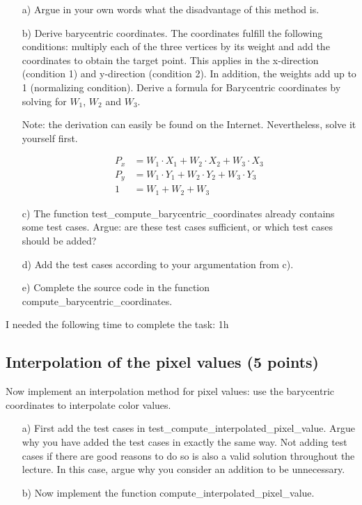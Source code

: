 \begin{enumerate}

\item[a)] Argue in your own words what the disadvantage of this method is.

\item[b)] Derive barycentric coordinates. The coordinates fulfill the following conditions: multiply each of the three vertices by its weight and add the coordinates to obtain the target point. This applies in the x-direction (condition 1) and y-direction (condition 2). In addition, the weights add up to 1 (normalizing condition). Derive a formula for
Barycentric coordinates by solving for $W_1$, $W_2$ and $W_3$.

Note: the derivation can easily be found on the Internet. Nevertheless, solve it yourself first.

\begin{align}
	P_x &= W_1 \cdot X_1 + W_2 \cdot X_2 + W_3 \cdot X_3 \\
	P_y &= W_1 \cdot Y_1 + W_2 \cdot Y_2 + W_3 \cdot Y_3 \\
	1 &= W_1 + W_2 + W_3
\end{align}

\item[c)] The function test\_compute\_barycentric\_coordinates already contains some test cases. Argue: are these test cases sufficient, or which test cases should be added? 

\item[d)] Add the test cases according to your argumentation from c). 

\item[e)] Complete the source code in the function compute\_barycentric\_coordinates. 

\end{enumerate}

I needed the following time to complete the task: 1h

\subsection{Interpolation of the pixel values (5 points)}

Now implement an interpolation method for pixel values: use the barycentric coordinates to interpolate color values. 

\begin{enumerate}

\item[a)] First add the test cases in test\_compute\_interpolated\_pixel\_value. Argue why you have added the test cases in exactly the same way. Not adding test cases if there are good reasons to do so is also a valid solution throughout the lecture. In this case, argue why you consider an addition to be unnecessary.

\item[b)] Now implement the function compute\_interpolated\_pixel\_value.

\end{enumerate}

